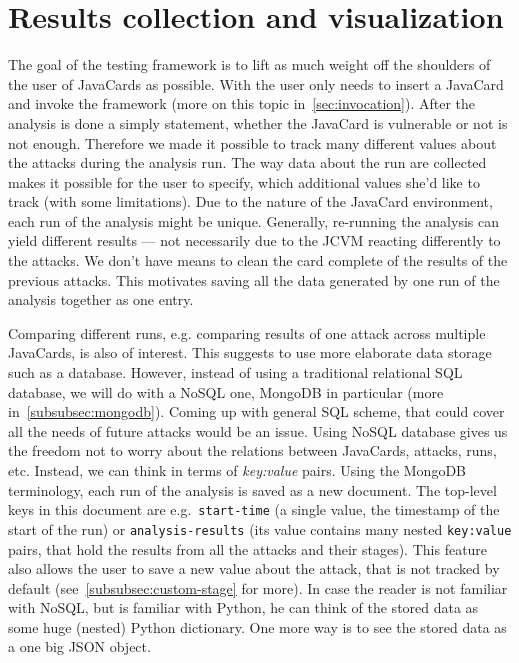         \section{Results collection and visualization}\label{sec:visualization}
        The goal of the testing framework is to lift as much weight off the shoulders of the user of JavaCards as possible. With \projectname the user only needs to insert a JavaCard and invoke the framework (more on this topic in~\ref{sec:invocation}). After the analysis is done a simply statement, whether the JavaCard is vulnerable or not is not enough. Therefore we made it possible to track many different values about the attacks during the analysis run. The way data about the run are collected makes it possible for the user to specify, which additional values she'd like to track (with some limitations). Due to the nature of the JavaCard environment, each run of the analysis might be unique. Generally, re-running the analysis can yield different results --- not necessarily due to the JCVM reacting differently to the attacks. We don't have means to clean the card complete of the results of the previous attacks. This motivates saving all the data generated by one run of the analysis together as one entry.


        Comparing different runs, e.g. comparing results of one attack across multiple JavaCards, is also of interest. This suggests to use more elaborate data storage such as a database. However, instead of using a traditional relational SQL database, we will do with a NoSQL one, MongoDB in particular (more in~\ref{subsubsec:mongodb}). Coming up with general SQL scheme, that could cover all the needs of future attacks would be an issue. Using NoSQL database gives us the freedom not to worry about the relations between JavaCards, attacks, runs, etc. Instead, we can think in terms of \textit{key:value} pairs. Using the MongoDB terminology, each run of the analysis is saved as a new document. The top-level keys in this document are e.g.\ \texttt{start-time} (a single value, the timestamp of the start of the run) or \texttt{analysis-results} (its value contains many nested \texttt{key:value} pairs, that hold the results from all the attacks and their stages). This feature also allows the user to save a new value about the attack, that is not tracked by default (see~\ref{subsubsec:custom-stage} for more). In case the reader is not familiar with NoSQL, but is familiar with Python, he can think of the stored data as some huge (nested) Python dictionary. One more way is to see the stored data as a one big JSON object.
      
